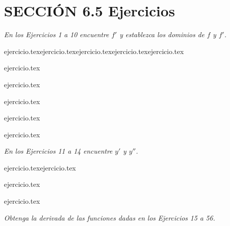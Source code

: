 
\section*{SECCIÓN 6.5 \quad Ejercicios}

\noindent \textit{En los Ejercicios 1 a 10 encuentre $f'$ y establezca los dominios de $f$ y $f'$.}

\begin{enumerate}
    \begin{minipage}{0.45\textwidth}
    {ejercicio.tex}{ejercicio.tex}{ejercicio.tex}{ejercicio.tex}{ejercicio.tex}\end{minipage}%
    \begin{minipage}{0.45\textwidth}
    \setcounter{enumi}{1}
    {ejercicio.tex}\addtocounter{enumi}{1}
    {ejercicio.tex}\addtocounter{enumi}{1}
    {ejercicio.tex}\addtocounter{enumi}{1}
    {ejercicio.tex}\addtocounter{enumi}{1}
    {ejercicio.tex}\end{minipage}
\end{enumerate}

\vspace{1em}
\noindent \textit{En los Ejercicios 11 a 14 encuentre $y'$ y $y''$.}

\begin{enumerate}
    \setcounter{enumi}{10}
    \begin{minipage}{0.45\textwidth}
    {ejercicio.tex}{ejercicio.tex}\end{minipage}%
    \begin{minipage}{0.45\textwidth}
    \setcounter{enumi}{11}
    {ejercicio.tex}\addtocounter{enumi}{1}
    {ejercicio.tex}\end{minipage}
\end{enumerate}

\vspace{1em}
\noindent \textit{Obtenga la derivada de las funciones dadas en los Ejercicios 15 a 56.}

